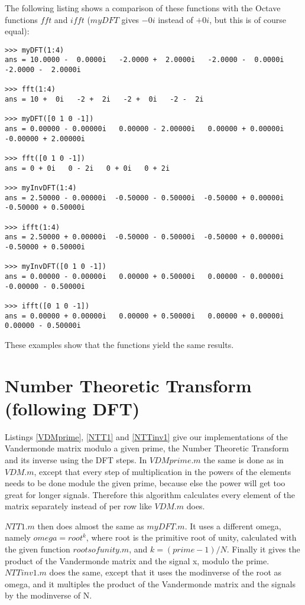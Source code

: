 \documentclass{article}
\begin{document}
The following listing shows a comparison of these functions with the Octave functions $fft$ and $ifft$ ($myDFT$ gives $-0i$ instead of $+0i$, but this is of course equal):

\begin{lstlisting}
>>> myDFT(1:4)
ans = 10.0000 -  0.0000i   -2.0000 +  2.0000i   -2.0000 -  0.0000i   -2.0000 -  2.0000i

>>> fft(1:4)
ans = 10 +  0i   -2 +  2i   -2 +  0i   -2 -  2i

>>> myDFT([0 1 0 -1])
ans = 0.00000 - 0.00000i   0.00000 - 2.00000i   0.00000 + 0.00000i   -0.00000 + 2.00000i

>>> fft([0 1 0 -1])
ans = 0 + 0i   0 - 2i   0 + 0i   0 + 2i

>>> myInvDFT(1:4)
ans = 2.50000 - 0.00000i  -0.50000 - 0.50000i  -0.50000 + 0.00000i   -0.50000 + 0.50000i

>>> ifft(1:4)
ans = 2.50000 + 0.00000i  -0.50000 - 0.50000i  -0.50000 + 0.00000i   -0.50000 + 0.50000i

>>> myInvDFT([0 1 0 -1])
ans = 0.00000 - 0.00000i   0.00000 + 0.50000i   0.00000 - 0.00000i   -0.00000 - 0.50000i

>>> ifft([0 1 0 -1])
ans = 0.00000 + 0.00000i   0.00000 + 0.50000i   0.00000 + 0.00000i    0.00000 - 0.50000i
\end{lstlisting}
These examples show that the functions yield the same results.

 
 
 
 
\section{Number Theoretic Transform (following DFT)}
Listings \ref{VDMprime}, \ref{NTT1} and \ref{NTTinv1} give our implementations of the Vandermonde matrix modulo a given prime, the Number Theoretic Transform and its inverse using the DFT steps. In $VDMprime.m$ the same is done as in $VDM.m$, except that every step of multiplication in the powers of the elements needs to be done module the given prime, because else the power will get too great for longer signals. Therefore this algorithm calculates every element of the matrix separately instead of per row like $VDM.m$ does. 

$NTT1.m$ then does almost the same as $myDFT.m$. It uses a different omega, namely $omega = root^k$, where root is the primitive root of unity, calculated with the given function $rootsofunity.m$, and $k = (prime - 1)/N$. Finally it gives the product of the Vandermonde matrix and the signal x, modulo the prime. $NTTinv1.m$ does the same, except that it uses the modinverse of the root as omega, and it multiples the product of the Vandermonde matrix and the signals by the modinverse of N.
\end{document}
